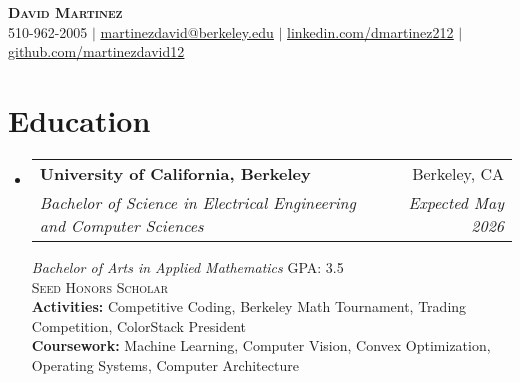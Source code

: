 \documentclass[letterpaper,11pt]{article}
\makeatletter
\newcommand{\resumeSubheading}[4]{
  \vspace{-2pt}\item
    \begin{tabular*}{0.98\textwidth}[t]{l@{\extracolsep{\fill}}r}
      \textbf{#1} & #2 \\
      \textit{\small#3} & \textit{\small #4} \\
    \end{tabular*}\vspace{-7pt}
}
\newcommand{\resumeSubHeadingListStart}{\begin{itemize}[leftmargin=0.15in, label={}]}
\newcommand{\resumeSubHeadingListEnd}{\end{itemize}}
\makeatother
\begin{document}

\begin{center}
    \textbf{\Huge \scshape David Martinez} \\ \vspace{4pt}
    \small 510-962-2005 $|$ \href{mailto:martinezdavid@berkeley.edu}{\underline{martinezdavid@berkeley.edu}} $|$ 
    \href{https://www.linkedin.com/in/dmartinez212/}{\underline{linkedin.com/dmartinez212}} $|$
    \href{https://github.com/martinezdavid12}{\underline{github.com/martinezdavid12}}
\end{center}

\vspace{-15pt}
\section{Education}
  \resumeSubHeadingListStart
    \resumeSubheading
      {University of California, Berkeley}{Berkeley, CA}
      {Bachelor of Science in Electrical Engineering and Computer Sciences}{Expected May 2026}
      \vspace{0.05cm}
      \newline
      \textit{\small Bachelor of Arts in Applied Mathematics} \hfill \small GPA: 3.5\\
      \textsc{\footnotesize{Seed Honors Scholar}}\\
      \small \textbf{Activities:} Competitive Coding, Berkeley Math Tournament, Trading Competition, ColorStack President \\
      \small \textbf{Coursework:} Machine Learning, Computer Vision, Convex Optimization, Operating Systems, Computer Architecture\\
    \resumeSubHeadingListEnd
  \vspace{-16pt}
\end{document}
